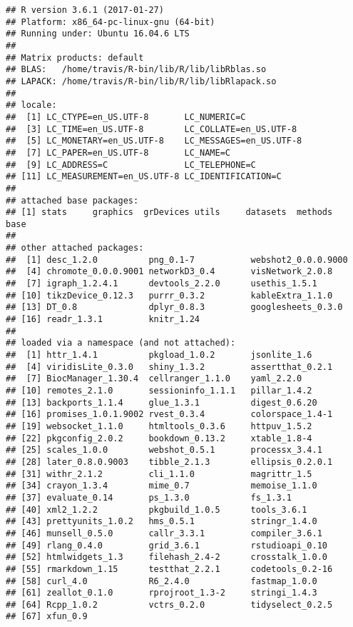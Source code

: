 \documentclass[]{article}
\begin{document}
\begin{verbatim}
## R version 3.6.1 (2017-01-27)
## Platform: x86_64-pc-linux-gnu (64-bit)
## Running under: Ubuntu 16.04.6 LTS
## 
## Matrix products: default
## BLAS:   /home/travis/R-bin/lib/R/lib/libRblas.so
## LAPACK: /home/travis/R-bin/lib/R/lib/libRlapack.so
## 
## locale:
##  [1] LC_CTYPE=en_US.UTF-8       LC_NUMERIC=C              
##  [3] LC_TIME=en_US.UTF-8        LC_COLLATE=en_US.UTF-8    
##  [5] LC_MONETARY=en_US.UTF-8    LC_MESSAGES=en_US.UTF-8   
##  [7] LC_PAPER=en_US.UTF-8       LC_NAME=C                 
##  [9] LC_ADDRESS=C               LC_TELEPHONE=C            
## [11] LC_MEASUREMENT=en_US.UTF-8 LC_IDENTIFICATION=C       
## 
## attached base packages:
## [1] stats     graphics  grDevices utils     datasets  methods   base     
## 
## other attached packages:
##  [1] desc_1.2.0          png_0.1-7           webshot2_0.0.0.9000
##  [4] chromote_0.0.0.9001 networkD3_0.4       visNetwork_2.0.8   
##  [7] igraph_1.2.4.1      devtools_2.2.0      usethis_1.5.1      
## [10] tikzDevice_0.12.3   purrr_0.3.2         kableExtra_1.1.0   
## [13] DT_0.8              dplyr_0.8.3         googlesheets_0.3.0 
## [16] readr_1.3.1         knitr_1.24         
## 
## loaded via a namespace (and not attached):
##  [1] httr_1.4.1          pkgload_1.0.2       jsonlite_1.6       
##  [4] viridisLite_0.3.0   shiny_1.3.2         assertthat_0.2.1   
##  [7] BiocManager_1.30.4  cellranger_1.1.0    yaml_2.2.0         
## [10] remotes_2.1.0       sessioninfo_1.1.1   pillar_1.4.2       
## [13] backports_1.1.4     glue_1.3.1          digest_0.6.20      
## [16] promises_1.0.1.9002 rvest_0.3.4         colorspace_1.4-1   
## [19] websocket_1.1.0     htmltools_0.3.6     httpuv_1.5.2       
## [22] pkgconfig_2.0.2     bookdown_0.13.2     xtable_1.8-4       
## [25] scales_1.0.0        webshot_0.5.1       processx_3.4.1     
## [28] later_0.8.0.9003    tibble_2.1.3        ellipsis_0.2.0.1   
## [31] withr_2.1.2         cli_1.1.0           magrittr_1.5       
## [34] crayon_1.3.4        mime_0.7            memoise_1.1.0      
## [37] evaluate_0.14       ps_1.3.0            fs_1.3.1           
## [40] xml2_1.2.2          pkgbuild_1.0.5      tools_3.6.1        
## [43] prettyunits_1.0.2   hms_0.5.1           stringr_1.4.0      
## [46] munsell_0.5.0       callr_3.3.1         compiler_3.6.1     
## [49] rlang_0.4.0         grid_3.6.1          rstudioapi_0.10    
## [52] htmlwidgets_1.3     filehash_2.4-2      crosstalk_1.0.0    
## [55] rmarkdown_1.15      testthat_2.2.1      codetools_0.2-16   
## [58] curl_4.0            R6_2.4.0            fastmap_1.0.0      
## [61] zeallot_0.1.0       rprojroot_1.3-2     stringi_1.4.3      
## [64] Rcpp_1.0.2          vctrs_0.2.0         tidyselect_0.2.5   
## [67] xfun_0.9
\end{verbatim}
\end{document}
